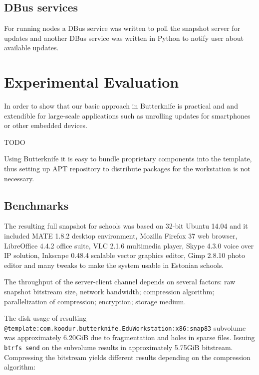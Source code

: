 \documentclass[a4paper,11pt]{kth-mag}
\begin{document}
\section{DBus services}

For running nodes a DBus service was written to poll the snapshot server
for updates and another DBus service was written in Python to notify user
about available updates.



%
%
%
%
\chapter{Experimental Evaluation}
\label{chap:eval}
In order to show that our basic approach in Butterknife is practical and
and extendible for large-scale applications such as unrolling
updates for smartphones or other embedded devices.

TODO

Using Butterknife it is easy to bundle proprietary components
into the template, thus setting up APT repository to distribute
packages for the workstation is not necessary.

\clearpage

\section{Benchmarks}

The resulting full snapshot for schools was based on 32-bit Ubuntu 14.04 and
it included MATE 1.8.2 desktop environment, Mozilla Firefox 37 web browser,
LibreOffice 4.4.2 office suite,
VLC 2.1.6 multimedia player,
Skype 4.3.0 voice over IP solution,
Inkscape 0.48.4 scalable vector graphics editor,
Gimp 2.8.10 photo editor and many tweaks
to make the system usable in Estonian schools.

The throughput of the server-client channel depends on
several factors: 
raw snapshot bitstream size,
network bandwidth;
compression algorithm;
parallelization of compression;
encryption;
storage medium.

The disk usage of resulting
\texttt{@template:com.koodur.butterknife.EduWorkstation:x86:snap83}
subvolume was approximately 6.20GiB
due to fragmentation and holes in sparse files.
Issuing \texttt{btrfs send} on the subvolume
results in approximately 5.75GiB bitstream.
Compressing the bitstream yields different
results depending on the compression algorithm:\\

\end{document}
